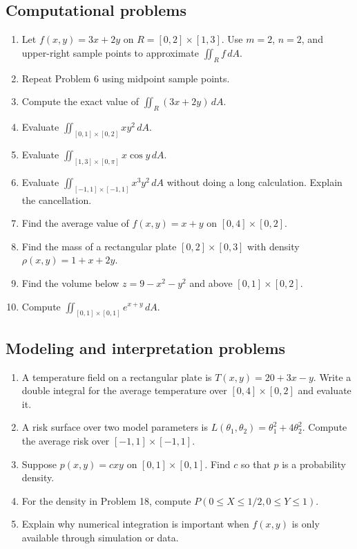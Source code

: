 \documentclass[11pt]{article}
\newcommand{\dA}{\,dA}
\begin{document}
\subsection*{Computational problems}
\begin{enumerate}[start=6]
  \item Let $f(x,y)=3x+2y$ on $R=[0,2]\times[1,3]$. Use $m=2$, $n=2$, and upper-right sample points to approximate $\iint_R f\dA$.
  \item Repeat Problem 6 using midpoint sample points.
  \item Compute the exact value of $\iint_R(3x+2y)\dA$.
  \item Evaluate $\iint_{[0,1]\times[0,2]}xy^2\dA$.
  \item Evaluate $\iint_{[1,3]\times[0,\pi]}x\cos y\dA$.
  \item Evaluate $\iint_{[-1,1]\times[-1,1]}x^3y^2\dA$ without doing a long calculation. Explain the cancellation.
  \item Find the average value of $f(x,y)=x+y$ on $[0,4]\times[0,2]$.
  \item Find the mass of a rectangular plate $[0,2]\times[0,3]$ with density $\rho(x,y)=1+x+2y$.
  \item Find the volume below $z=9-x^2-y^2$ and above $[0,1]\times[0,2]$.
  \item Compute $\iint_{[0,1]\times[0,1]}e^{x+y}\dA$.
\end{enumerate}

\subsection*{Modeling and interpretation problems}
\begin{enumerate}[start=16]
  \item A temperature field on a rectangular plate is $T(x,y)=20+3x-y$. Write a double integral for the average temperature over $[0,4]\times[0,2]$ and evaluate it.
  \item A risk surface over two model parameters is $L(\theta_1,\theta_2)=\theta_1^2+4\theta_2^2$. Compute the average risk over $[-1,1]\times[-1,1]$.
  \item Suppose $p(x,y)=cxy$ on $[0,1]\times[0,1]$. Find $c$ so that $p$ is a probability density.
  \item For the density in Problem 18, compute $P(0\le X\le 1/2,0\le Y\le 1)$.
  \item Explain why numerical integration is important when $f(x,y)$ is only available through simulation or data.
\end{enumerate}
\end{document}
